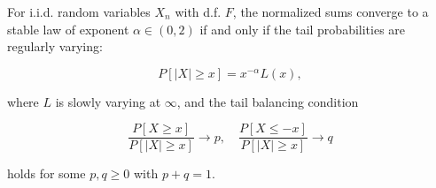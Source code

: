 For i.i.d. random variables $X_n$ with d.f. $F$, the normalized sums converge to a stable law of exponent $\alpha \in (0,2)$ if and only if the tail probabilities are regularly varying:

$$P[|X| \geq x] = x^{-\alpha} L(x),$$

where $L$ is slowly varying at $\infty$, and the tail balancing condition

$$\frac{P[X \geq x]}{P[|X| \geq x]} \to p, \quad \frac{P[X \leq -x]}{P[|X| \geq x]} \to q$$

holds for some $p, q \geq 0$ with $p + q = 1$.
